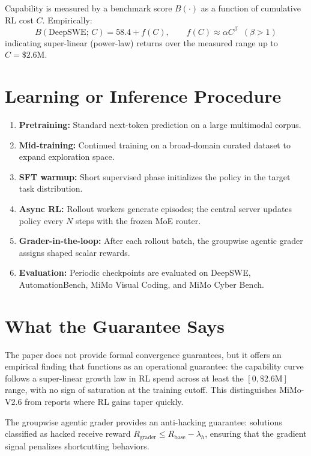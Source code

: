 \documentclass[10pt,twocolumn]{article}
\begin{document}
Capability is measured by a benchmark score $B(\cdot)$ as a function of cumulative
RL cost $C$. Empirically:
\[
B(\text{DeepSWE};\,C) = 58.4 + f(C),\qquad
f(C) \approx \alpha C^\beta \;\; (\beta > 1)
\]
indicating super-linear (power-law) returns over the measured range up to
$C = \$2.6\text{M}$.

\section{Learning or Inference Procedure}

\begin{enumerate}[itemsep=2pt,parsep=0pt]
  \item \textbf{Pretraining:} Standard next-token prediction on a large
    multimodal corpus.
  \item \textbf{Mid-training:} Continued training on a broad-domain curated dataset
    to expand exploration space.
  \item \textbf{SFT warmup:} Short supervised phase initializes the policy in the
    target task distribution.
  \item \textbf{Async RL:} Rollout workers generate episodes; the central server
    updates policy every $N$ steps with the frozen MoE router.
  \item \textbf{Grader-in-the-loop:} After each rollout batch, the groupwise
    agentic grader assigns shaped scalar rewards.
  \item \textbf{Evaluation:} Periodic checkpoints are evaluated on DeepSWE,
    AutomationBench, MiMo Visual Coding, and MiMo Cyber Bench.
\end{enumerate}

\section{What the Guarantee Says}

The paper does not provide formal convergence guarantees, but it offers an empirical
finding that functions as an operational guarantee: the capability curve follows a
super-linear growth law in RL spend across at least the $[0, \$2.6\text{M}]$ range,
with no sign of saturation at the training cutoff. This distinguishes MiMo-V2.6 from
reports where RL gains taper quickly.

The groupwise agentic grader provides an anti-hacking guarantee: solutions classified
as hacked receive reward $R_{\text{grader}} \leq R_{\text{base}} - \lambda_h$,
ensuring that the gradient signal penalizes shortcutting behaviors.
\end{document}
